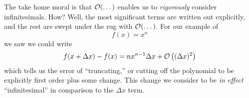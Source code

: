 The take home moral is that $\mathcal{O}(\dots)$ enables us to
\emph{rigorously} consider infinitesimals. How? Well, the most
significant terms are written out explicitly, and the rest are
swept under the rug with $\mathcal{O}(\dots)$. For our example of
\begin{equation}
f(x)=x^{n}
\end{equation}
we saw we could write
\begin{equation}
f(x+\Delta x)-f(x)=nx^{n-1}\Delta x+\mathcal{O}\left((\Delta
x)^{2}\right)
\end{equation}
which tells us the error of ``truncating,'' or cutting off the
polynomial to be explicitly first order plus some change. This
change we consider to be \emph{in effect} ``infinitesimal'' in
comparison to the $\Delta x$ term.

